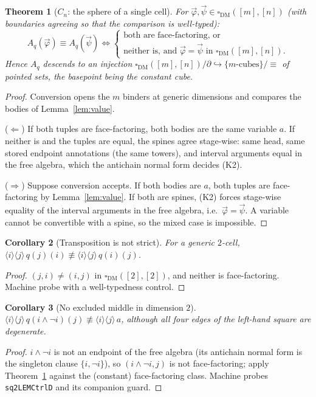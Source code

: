 \documentclass[11pt]{amsart}
\newtheorem{thm}{Theorem}[section]
\newtheorem{cor}[thm]{Corollary}
\theoremstyle{definition}
\newcommand{\Dbox}{\square_{\mathrm{DM}}}
\newcommand{\aconv}{\equiv}
\newcommand{\nconv}{\not\equiv}
\newcommand{\act}[1]{A_{#1}}
\begin{document}
\begin{thm}[$C_n$: the sphere of a single cell]\label{thm:cn}
  For $\vec\varphi, \vec\psi \in \Dbox([m],[n])$ (with boundaries
  agreeing so that the comparison is well-typed):
  \[
    \act{q}(\vec\varphi) \aconv \act{q}(\vec\psi)
    \iff
    \begin{cases}
      \text{both are face-factoring, or}\\
      \text{neither is, and } \vec\varphi = \vec\psi
      \text{ in } \Dbox([m],[n]).
    \end{cases}
  \]
  Hence $\act{q}$ descends to an injection
  $\Dbox([m],[n])/\partial \hookrightarrow
  \{\text{$m$-cubes}\}/{\aconv}$ of pointed sets, the basepoint
  being the constant cube.
\end{thm}
\begin{proof}
  Conversion opens the $m$ binders at generic dimensions and
  compares the bodies of Lemma~\ref{lem:value}.

  ($\Leftarrow$)  If both tuples are face-factoring, both bodies are
  the same variable $a$.  If neither is and the tuples are equal,
  the spines agree stage-wise: same head, same stored endpoint
  annotations (the same towers), and interval arguments equal in
  the free algebra, which the antichain normal form decides (K2).

  ($\Rightarrow$)  Suppose conversion accepts.  If both bodies are
  $a$, both tuples are face-factoring by Lemma~\ref{lem:value}.  If
  both are spines, (K2) forces stage-wise equality of the interval
  arguments in the free algebra, i.e.\ $\vec\varphi = \vec\psi$.
  A variable cannot be convertible with a spine, so the mixed case
  is impossible.
\end{proof}

\begin{cor}[Transposition is not strict]\label{cor:transpose}
  For a generic $2$-cell,
  $\langle i \rangle \langle j \rangle\, q(j)(i) \nconv
   \langle i \rangle \langle j \rangle\, q(i)(j)$.
\end{cor}
\begin{proof}
  $(j,i) \ne (i,j)$ in $\Dbox([2],[2])$, and neither is
  face-factoring.  Machine probe with a well-typedness control.
\end{proof}

\begin{cor}[No excluded middle in dimension $2$]\label{cor:lem}
  $\langle i \rangle \langle j \rangle\, q(i \wedge \neg i)(j)
  \nconv \langle i \rangle \langle j \rangle\, a$, although all
  four edges of the left-hand square are degenerate.
\end{cor}
\begin{proof}
  $i \wedge \neg i$ is not an endpoint of the free algebra
  (its antichain normal form is the singleton clause
  $\{i, \neg i\}$), so $(i \wedge \neg i, j)$ is not
  face-factoring; apply Theorem~\ref{thm:cn} against the (constant)
  face-factoring class.  Machine probes \texttt{sq2LEMCtrlD} and
  its companion guard.
\end{proof}
\end{document}
